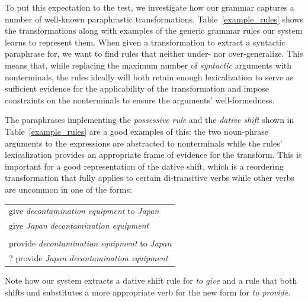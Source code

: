 \documentclass[11pt]{article}
\begin{document}
To put this expectation to the test, we investigate how our grammar
captures a number of well-known paraphrastic
transformations. Table~\ref{example_rules} shows the transformations
along with examples of the generic grammar rules our system learns to
represent them. When given a transformation to extract a syntactic
paraphrase for, we want to find rules that neither under- nor
over-generalize. This means that, while replacing the maximum number
of \emph{syntactic} arguments with nonterminals, the rules ideally
will both retain enough lexicalization to serve as sufficient evidence
for the applicability of the transformation and impose constraints on
the nonterminals to ensure the arguments' well-formedness.

The paraphrases implementing the \emph{possessive rule} and the
\emph{dative shift} shown in Table~\ref{example_rules} are a good
examples of this: the two noun-phrase arguments to the expressions are
abstracted to nonterminals while the rules' lexicalization provides an
appropriate frame of evidence for the transform. This is important for
a good representation of the dative shift, which is a reordering
transformation that fully applies to certain di-transitive verbs while
other verbs are uncommon in one of the forms:
\begin{center}
\begin{tabular}{l}
  give \emph{decontamination equipment} to \emph{Japan} \\
  give \emph{Japan} \emph{decontamination equipment} \\
  \vspace{-10pt}\\
  provide \emph{decontamination equipment} to \emph{Japan} \\
  ? provide \emph{Japan} \emph{decontamination equipment} \\
\end{tabular}
\end{center}
Note how our system extracts a dative shift rule for \emph{to give}
and a rule that both shifts and substitutes a more appropriate verb
for the new form for \emph{to provide}.
\end{document}

